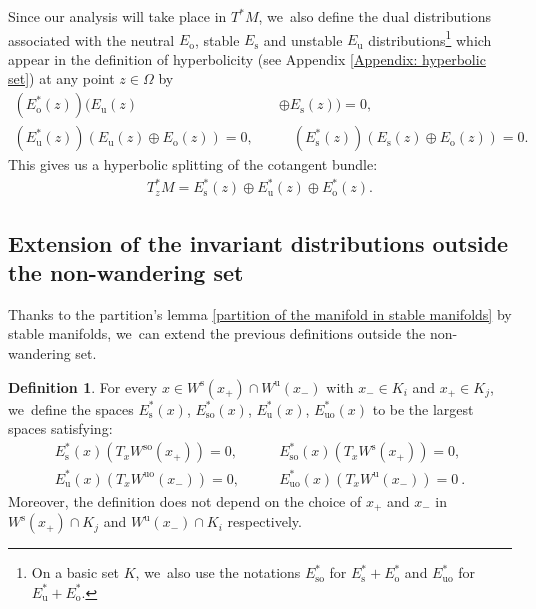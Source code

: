 \documentclass[11pt]{article}
\newcommand{\Subsection}{\subsection}
\newcommand{\ro}{\mathrm{o}}
\newcommand{\rs}{\mathrm{s}}
\newcommand{\rso}{\mathrm{so}}
\newcommand{\ru}{\mathrm{u}}
\newcommand{\ruo}{\mathrm{uo}}
\theoremstyle{definition}
\newtheorem{definition}{Definition}[section]
\theoremstyle{plain}
\begin{document}
Since our analysis will take place in $T^* M$, we~also define the dual distributions associated with the neutral $E_\ro$, stable $E_\rs$ and unstable $E_\ru$ distributions\footnote{On a basic set $K$, we~also use the notations $E_{\rso}^*$ for $E_\rs^* + E_\ro^*$ and $E_{\ruo}^*$ for $E_\ru^* + E_\ro^*$.} which appear in the definition of hyperbolicity (see Appendix \ref{Appendix: hyperbolic set}) at any point $z \in \Omega$ by
\begin{align*}
(E_\ro^*(z))(E_\ru(z) &\oplus E_\rs(z)) = 0, \\
(E_\ru^*(z))(E_\ru(z) \oplus E_\ro(z)) = 0, \quad & \quad (E_\rs^*(z))(E_\rs(z) \oplus E_\ro(z)) = 0.
\end{align*}
This gives us a hyperbolic splitting of the cotangent bundle:
\begin{align*}
T_z^* M = E_\rs^* (z) \oplus E_\ru^* (z) \oplus E_\ro^*(z).
\end{align*}

\Subsection{Extension of the invariant distributions outside the non-wandering set}

Thanks to the partition's lemma \ref{partition of the manifold in stable manifolds} by stable manifolds, we~can extend the previous definitions outside the non-wandering set.

\begin{definition}\label{def distributions duales stables et instables sur Omega}
For every $x \in W^\rs (x_+) \cap W^\ru (x_{-})$ with $x_- \in K_i$ and $x_+ \in K_j$, we~define the spaces $E_\rs^*(x)$, $E_\rso^* (x)$, $E_\ru^*(x)$, $E_{\ruo}^* (x)$ to be the largest spaces satisfying:
\begin{align*}
E_\rs^*(x) (T_x W^{\rso} (x_+)) = 0, &\qquad E_\rso^* (x)(T_x W^{\rs} (x_+)) = 0,\\
E_\ru^*(x) (T_x W^{\ruo} (x_-)) = 0, &\qquad E_{\ruo}^* (x)(T_x W^{\ru} (x_-)) = 0 \:.
\end{align*}
Moreover, the definition does not depend on the choice of $x_+$ and $x_-$ in $W^\rs (x_+) \cap K_j$ and $W^\ru (x_-) \cap K_i$ respectively.
\end{definition}
\end{document}
